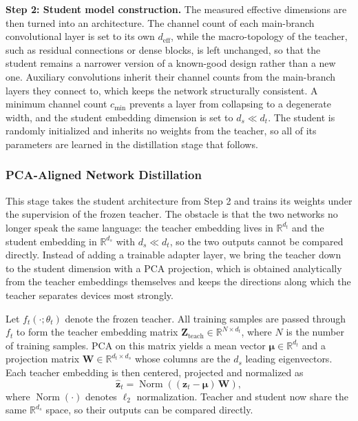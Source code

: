 \documentclass[journal,comsoc]{IEEEtran}
\begin{document}
\textbf{Step 2: Student model construction.}
The measured effective dimensions are then turned into an architecture. The channel count of each main-branch convolutional layer is set to its own $d_{\text{eff}}$, while the macro-topology of the teacher, such as residual connections or dense blocks, is left unchanged, so that the student remains a narrower version of a known-good design rather than a new one. Auxiliary convolutions inherit their channel counts from the main-branch layers they connect to, which keeps the network structurally consistent. A minimum channel count $c_{\min}$ prevents a layer from collapsing to a degenerate width, and the student embedding dimension is set to $d_s \ll d_t$. The student is randomly initialized and inherits no weights from the teacher, so all of its parameters are learned in the distillation stage that follows.

\subsubsection{PCA-Aligned Network Distillation}

This stage takes the student architecture from Step 2 and trains its weights under the supervision of the frozen teacher. The obstacle is that the two networks no longer speak the same language: the teacher embedding lives in $\mathbb{R}^{d_t}$ and the student embedding in $\mathbb{R}^{d_s}$ with $d_s \ll d_t$, so the two outputs cannot be compared directly. Instead of adding a trainable adapter layer, we bring the teacher down to the student dimension with a PCA projection, which is obtained analytically from the teacher embeddings themselves and keeps the directions along which the teacher separates devices most strongly.

Let $f_t(\cdot;\theta_t)$ denote the frozen teacher. All training samples are passed through $f_t$ to form the teacher embedding matrix $\mathbf{Z}_{\text{teach}} \in \mathbb{R}^{N \times d_t}$, where $N$ is the number of training samples. PCA on this matrix yields a mean vector $\boldsymbol{\mu} \in \mathbb{R}^{d_t}$ and a projection matrix $\mathbf{W} \in \mathbb{R}^{d_t \times d_s}$ whose columns are the $d_s$ leading eigenvectors. Each teacher embedding is then centered, projected and normalized as
\begin{equation}
\label{eq:proj}
\hat{\mathbf{z}}_t =
\operatorname{Norm}\!\left(
(\mathbf{z}_t - \boldsymbol{\mu}) \, \mathbf{W}
\right),
\end{equation}
where $\operatorname{Norm}(\cdot)$ denotes $\ell_2$ normalization. Teacher and student now share the same $\mathbb{R}^{d_s}$ space, so their outputs can be compared directly.
\end{document}
